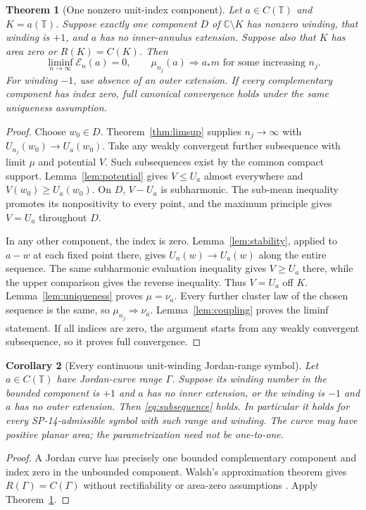 \documentclass[11pt]{article}
\newtheorem{theorem}{Theorem}[section]
\newtheorem{corollary}[theorem]{Corollary}
\theoremstyle{definition}
\newcommand{\T}{\mathbb T}
\newcommand{\C}{\mathbb C}
\newcommand{\E}{\mathcal E}
\begin{document}
\begin{theorem}[One nonzero unit-index component]\label{thm:onecomponent}
Let $a\in C(\T)$ and $K=a(\T)$. Suppose exactly one component $D$ of $\C\setminus K$ has nonzero winding, that winding is $+1$, and $a$ has no inner-annulus extension. Suppose also that $K$ has area zero or $R(K)=C(K)$. Then
\begin{equation}
 \liminf_{n\to\infty}\E_n(a)=0,
 \qquad \mu_{n_j}(a)\Rightarrow a_*m
 \text{ for some increasing }n_j.
 \label{eq:subsequence}
\end{equation}
For winding $-1$, use absence of an outer extension. If every complementary component has index zero, full canonical convergence holds under the same uniqueness assumption.
\end{theorem}
\begin{proof}
Choose $w_0\in D$. Theorem~\ref{thm:limsup} supplies $n_j\to\infty$ with $U_{n_j}(w_0)\to U_a(w_0)$. Take any weakly convergent further subsequence with limit $\mu$ and potential $V$. Such subsequences exist by the common compact support. Lemma~\ref{lem:potential} gives $V\le U_a$ almost everywhere and $V(w_0)\ge U_a(w_0)$. On $D$, $V-U_a$ is subharmonic. The sub-mean inequality promotes its nonpositivity to every point, and the maximum principle gives $V=U_a$ throughout $D$.

In any other component, the index is zero. Lemma~\ref{lem:stability}, applied to $a-w$ at each fixed point there, gives $U_n(w)\to U_a(w)$ along the entire sequence. The same subharmonic evaluation inequality gives $V\ge U_a$ there, while the upper comparison gives the reverse inequality. Thus $V=U_a$ off $K$. Lemma~\ref{lem:uniqueness} proves $\mu=\nu_a$. Every further cluster law of the chosen sequence is the same, so $\mu_{n_j}\Rightarrow\nu_a$. Lemma~\ref{lem:coupling} proves the liminf statement. If all indices are zero, the argument starts from any weakly convergent subsequence, so it proves full convergence.
\end{proof}

\begin{corollary}[Every continuous unit-winding Jordan-range symbol]\label{cor:Jordan}
Let $a\in C(\T)$ have Jordan-curve range $\Gamma$. Suppose its winding number in the bounded component is $+1$ and $a$ has no inner extension, or the winding is $-1$ and $a$ has no outer extension. Then \eqref{eq:subsequence} holds. In particular it holds for every SP-14-admissible symbol with such range and winding. The curve may have positive planar area; the parametrization need not be one-to-one.
\end{corollary}
\begin{proof}
A Jordan curve has precisely one bounded complementary component and index zero in the unbounded component. Walsh's approximation theorem gives $R(\Gamma)=C(\Gamma)$ without rectifiability or area-zero assumptions \cite[Section~4, printed p.~9]{walsh}. Apply Theorem~\ref{thm:onecomponent}.
\end{proof}
\end{document}
